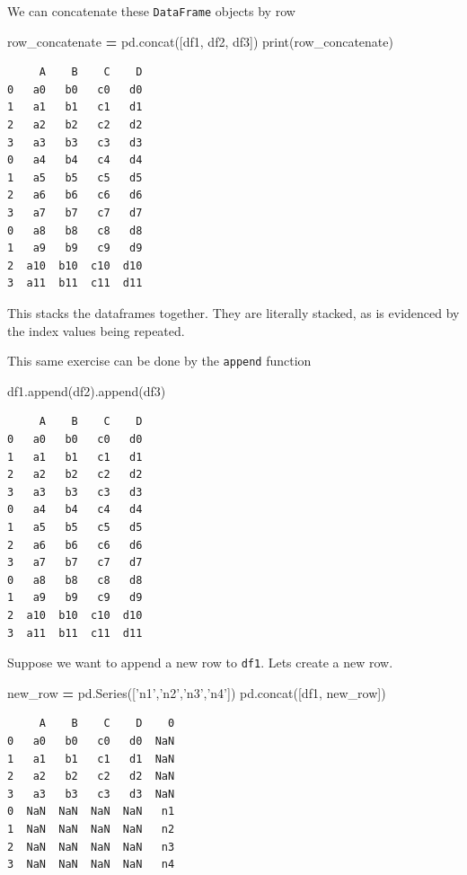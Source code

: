 \documentclass[
  letterpaper,
]{scrbook}
\newenvironment{Shaded}{\begin{snugshade}}{\end{snugshade}}
\newcommand{\BuiltInTok}[1]{#1}
\newcommand{\NormalTok}[1]{#1}
\newcommand{\OperatorTok}[1]{\textcolor[rgb]{0.81,0.36,0.00}{\textbf{#1}}}
\newcommand{\StringTok}[1]{\textcolor[rgb]{0.31,0.60,0.02}{#1}}
\begin{document}
We can concatenate these \texttt{DataFrame} objects by row

\begin{Shaded}
\begin{Highlighting}[]
\NormalTok{row_concatenate }\OperatorTok{=}\NormalTok{ pd.concat([df1, df2, df3])}
\BuiltInTok{print}\NormalTok{(row_concatenate)}
\end{Highlighting}
\end{Shaded}

\begin{verbatim}
     A    B    C    D
0   a0   b0   c0   d0
1   a1   b1   c1   d1
2   a2   b2   c2   d2
3   a3   b3   c3   d3
0   a4   b4   c4   d4
1   a5   b5   c5   d5
2   a6   b6   c6   d6
3   a7   b7   c7   d7
0   a8   b8   c8   d8
1   a9   b9   c9   d9
2  a10  b10  c10  d10
3  a11  b11  c11  d11
\end{verbatim}

This stacks the dataframes together. They are literally stacked, as is evidenced by the index values being repeated.

This same exercise can be done by the \texttt{append} function

\begin{Shaded}
\begin{Highlighting}[]
\NormalTok{df1.append(df2).append(df3)}
\end{Highlighting}
\end{Shaded}

\begin{verbatim}
     A    B    C    D
0   a0   b0   c0   d0
1   a1   b1   c1   d1
2   a2   b2   c2   d2
3   a3   b3   c3   d3
0   a4   b4   c4   d4
1   a5   b5   c5   d5
2   a6   b6   c6   d6
3   a7   b7   c7   d7
0   a8   b8   c8   d8
1   a9   b9   c9   d9
2  a10  b10  c10  d10
3  a11  b11  c11  d11
\end{verbatim}

Suppose we want to append a new row to \texttt{df1}. Lets create a new row.

\begin{Shaded}
\begin{Highlighting}[]
\NormalTok{new_row }\OperatorTok{=}\NormalTok{ pd.Series([}\StringTok{'n1'}\NormalTok{,}\StringTok{'n2'}\NormalTok{,}\StringTok{'n3'}\NormalTok{,}\StringTok{'n4'}\NormalTok{])}
\NormalTok{pd.concat([df1, new_row])}
\end{Highlighting}
\end{Shaded}

\begin{verbatim}
     A    B    C    D    0
0   a0   b0   c0   d0  NaN
1   a1   b1   c1   d1  NaN
2   a2   b2   c2   d2  NaN
3   a3   b3   c3   d3  NaN
0  NaN  NaN  NaN  NaN   n1
1  NaN  NaN  NaN  NaN   n2
2  NaN  NaN  NaN  NaN   n3
3  NaN  NaN  NaN  NaN   n4
\end{verbatim}
\end{document}
